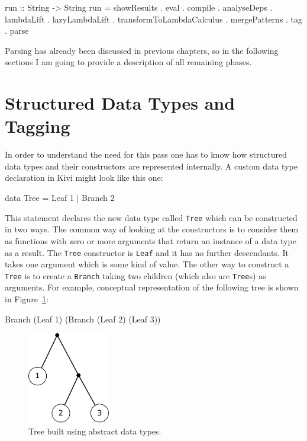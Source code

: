 \documentclass[12pt,a4paper]{report}
\begin{document}
\vspace*{0.2in}
\begin{code}[style=haskell]
run :: String -> String
run = showResults
    . eval
    . compile
    . analyseDeps
    . lambdaLift
    . lazyLambdaLift
    . transformToLambdaCalculus
    . mergePatterns
    . tag
    . parse
\end{code}

Parsing has already been discussed in previous chapters, so in the following
sections I am going to provide a description of all remaining phases.

\section{Structured Data Types and Tagging}
In order to understand the need for this pass one has to know how structured
data types and their constructors are represented internally.
A custom data type declaration in Kivi might look like this one:

\vspace*{0.2in}
\begin{code}[style=haskell]
data Tree = Leaf 1 | Branch 2
\end{code}

This statement declares the new data type called \texttt{Tree} which can be
constructed in two ways. The common way of looking at the constructors is to
consider them as functions with zero or more arguments that return an instance
of a data type as a result. The \texttt{Tree} constructor is \texttt{Leaf} and
it has no further descendants. It takes one argument which is some kind of
value. The other way to construct a \texttt{Tree} is to create a \texttt{Branch}
taking two children (which also are \texttt{Tree}s) as arguments. For example,
conceptual representation of the following tree is shown in Figure~\ref{fig:tree}:

\vspace*{0.2in}
\begin{code}[style=haskell]
Branch (Leaf 1) (Branch (Leaf 2) (Leaf 3))
\end{code}

\begin{figure}[h!]
  \centering
  \includegraphics[height=4cm]{tree}
  \caption{Tree built using abstract data types.}
  \label{fig:tree}
\end{figure}
\end{document}
